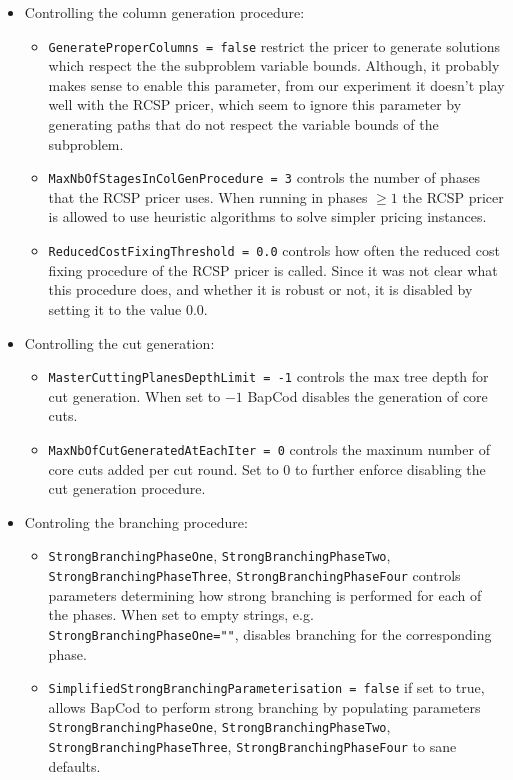 \begin{itemize}
	\item Controlling the column generation procedure:
	      \begin{itemize}
		      \item \texttt{GenerateProperColumns = false} restrict the pricer to generate solutions which respect the the subproblem variable bounds.
		            Although, it probably makes sense to enable this parameter, from our experiment it doesn't play well with the RCSP pricer, which seem to ignore this parameter by generating paths that do not respect the variable bounds of the subproblem.
		      \item \texttt{MaxNbOfStagesInColGenProcedure = 3} controls the number of phases that the RCSP pricer uses.
		            When running in phases $\ge 1$ the RCSP pricer is allowed to use heuristic algorithms to solve simpler pricing instances.
		      \item \texttt{ReducedCostFixingThreshold = 0.0} controls how often the reduced cost fixing procedure of the RCSP pricer is called.
		            Since it was not clear what this procedure does, and whether it is robust or not, it is disabled by setting it to the value $0.0$.
	      \end{itemize}

	\item Controlling the cut generation:
	      \begin{itemize}
		      \item \texttt{MasterCuttingPlanesDepthLimit = -1} controls the max tree depth for cut generation.
		            When set to $-1$ BapCod disables the generation of core cuts.
		      \item \texttt{MaxNbOfCutGeneratedAtEachIter = 0} controls the maxinum number of core cuts added per cut round.
		            Set to $0$ to further enforce disabling the cut generation procedure.
	      \end{itemize}

	\item Controling the branching procedure:
	      \begin{itemize}
		      \item \texttt{StrongBranchingPhaseOne}, \texttt{StrongBranchingPhaseTwo}, \texttt{StrongBranchingPhaseThree}, \texttt{StrongBranchingPhaseFour} controls parameters determining how strong branching is performed for each of the phases.
		            When set to empty strings, e.g. \texttt{StrongBranchingPhaseOne=""}, disables branching for the corresponding phase.
		      \item \texttt{SimplifiedStrongBranchingParameterisation = false} if set to true, allows BapCod to perform strong branching by populating parameters \texttt{StrongBranchingPhaseOne}, \texttt{StrongBranchingPhaseTwo}, \texttt{StrongBranchingPhaseThree}, \texttt{StrongBranchingPhaseFour} to sane defaults.
	      \end{itemize}


\end{itemize}
